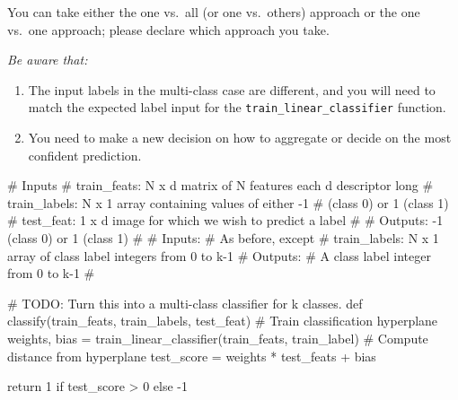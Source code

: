 You can take either the one vs.~all (or one vs.~others) approach or the one vs.~one approach; please declare which approach you take.


\emph{Be aware that:}
\begin{enumerate}
    \item The input labels in the multi-class case are different, and you will need to match the expected label input for the \texttt{train\_linear\_classifier} function.
    \item You need to make a new decision on how to aggregate or decide on the most confident prediction.
\end{enumerate}


\pagebreak
\begin{tcolorbox}[enhanced jigsaw,breakable,pad at break*=1mm,colback=white!5!white,colframe=green!75!black,height fixed for=all]
\begin{python}
# Inputs
#   train_feats: N x d matrix of N features each d descriptor long
#   train_labels: N x 1 array containing values of either -1 
#               (class 0) or 1 (class 1)
#   test_feat: 1 x d image for which we wish to predict a label
#
#   Outputs: -1 (class 0) or 1 (class 1)
#
# Inputs:
#    As before, except
#    train_labels: N x 1 array of class label integers from 0 to k-1
# Outputs:
#    A class label integer from 0 to k-1
#

# TODO: Turn this into a multi-class classifier for k classes.
def classify(train_feats, train_labels, test_feat)
    # Train classification hyperplane
    weights, bias = train_linear_classifier(train_feats, train_label)
    # Compute distance from hyperplane
    test_score = weights * test_feats + bias

    return 1 if test_score > 0 else -1
    
\end{python}


\end{tcolorbox}

